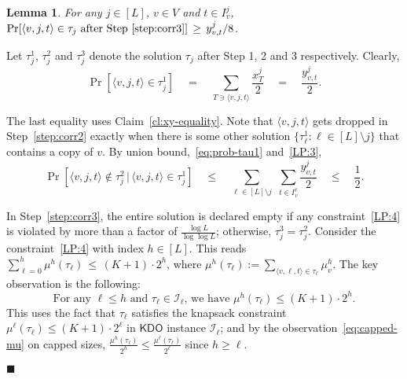 \documentclass[11pt,letterpaper]{article}
\newtheorem{lemma}[theorem]{Lemma}
\numberwithin{algorithm}{section}
\newenvironment{proof}{

\noindent{\bf Proof:}}
{\hfill$\blacksquare$


}
\newcommand{\I}{{\mathcal{I}}}
\newcommand{\kdo}{\ensuremath{\mathsf{KDO}}\xspace}
\begin{document}
\begin{lemma} \label{lem:RRalt}
For any $j\in[L]$, $v\in V$ and $t\in I^j_v$,
$\Pr[\langle v,j,t\rangle \in \tau_j \mbox{ after Step~\ref{step:corr3}}]\,\ge\, y^j_{v,t}/8$.
\end{lemma}
\begin{proof}
Let $\tau^1_j$, $\tau^2_j$ and $\tau^3_j$ denote the solution $\tau_j$ after Step 1, 2 and 3 respectively. Clearly,
\vspace{-2mm}\begin{equation}\label{eq:prob-tau1}
\Pr\left[\langle v,j,t\rangle \in \tau_j^1\right] \quad = \quad\sum_{T\ni \langle v,j,t\rangle} \frac{x^j_T}{2} \quad = \quad \frac{y^j_{v,t}}{2}.
\end{equation}
\vspace{-3mm}

The last equality uses Claim~\ref{cl:xy-equality}. Note that $\langle v,j,t\rangle$ gets dropped in Step~\ref{step:corr2} exactly when there is some other solution $\{\tau^1_{\ell} : \ell\in[L]\setminus j\}$ that contains a copy of $v$. By union bound,~\eqref{eq:prob-tau1} and~\eqref{LP:3},
\vspace{-2mm}\begin{equation}\label{eq:prob-tau2}\Pr\left[\langle v,j,t\rangle \not\in \tau_j^2 \, |\, \langle v,j,t\rangle \in \tau_j^1\right] \quad \le \quad \sum_{\ell\in [L]\setminus j}\,\,  \sum_{t\in I^\ell_v} \frac{y^j_{v,t}}{2}\quad \le \quad \frac{1}{2}.
\end{equation}\vspace{-5mm}

In Step~\ref{step:corr3}, the entire solution is declared empty if any constraint~\eqref{LP:4} is violated by more than a factor of $\frac{\log L}{\log\log L}$; otherwise, $\tau^3_j=\tau^2_j$. Consider the constraint~\eqref{LP:4} with index $h\in[L]$. This reads $\sum_{\ell=0}^h \mu^h(\tau_\ell) \,\le\, (K+1)\cdot 2^h$, where $\mu^h(\tau_\ell):= \sum_{\langle v,\ell,t\rangle \in \tau_\ell} \mu^h_v$. The key observation is the following:
\begin{equation}\label{eq:main-RR}
\mbox{For any $\ell\le h$ and $\tau_\ell\in \I_\ell$, we have }\mu^h(\tau_\ell)\le (K+1)\cdot 2^h.
\end{equation}
This uses the fact that $\tau_\ell$ satisfies the knapsack constraint $\mu^\ell(\tau_\ell)\le (K+1)\cdot 2^\ell$ in \kdo instance $\I_\ell$; and by the observation~\eqref{eq:capped-mu} on capped sizes, $\frac{\mu^h(\tau_\ell)}{2^h}\le \frac{\mu^\ell(\tau_\ell)}{2^\ell}$ since $h\ge \ell$.


\end{proof}
\end{document}
